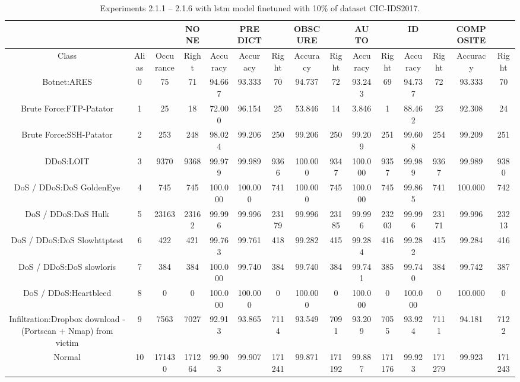 \begin{table}[htb]
    \centering
    \caption{Experiments 2.1.1 – 2.1.6 with \gls{lstm} model finetuned with 10\% of dataset CIC-IDS2017.}
    \label{table:results:lstm:flows_10}
    \begin{tabular}{@{}ccccccccccccccc@{}}
        \toprule
         &  &  & NONE &  & PREDICT &  & OBSCURE &  & AUTO &  & ID &  & COMPOSITE &  \\
        \midrule
        Class &  Alias &  Occurance &  Right &  Accuracy &  Accuracy &  Right &  Accuracy &  Right &  Accuracy &  Right &  Accuracy &  Right &  Accuracy &  Right \\
        Botnet:ARES &  0 &  75 &  71 &  94.667 &  93.333 &  70 &  94.737 &  72 &  93.243 &  69 &  94.737 &  72 &  93.333 &  70 \\
        Brute Force:FTP-Patator &  1 &  25 &  18 &  72.000 &  96.154 &  25 &  53.846 &  14 &  3.846 &  1 &  88.462 &  23 &  92.308 &  24 \\
        Brute Force:SSH-Patator &  2 &  253 &  248 &  98.024 &  99.206 &  250 &  99.206 &  250 &  99.209 &  251 &  99.608 &  254 &  99.209 &  251 \\
        DDoS:LOIT &  3 &  9370 &  9368 &  99.979 &  99.989 &  9366 &  100.000 &  9347 &  100.000 &  9357 &  99.989 &  9367 &  99.989 &  9380 \\
        DoS / DDoS:DoS GoldenEye &  4 &  745 &  745 &  100.000 &  100.000 &  741 &  100.000 &  745 &  100.000 &  745 &  99.865 &  741 &  100.000 &  742 \\
        DoS / DDoS:DoS Hulk &  5 &  23163 &  23162 &  99.996 &  99.996 &  23179 &  99.996 &  23185 &  99.996 &  23203 &  99.996 &  23171 &  99.996 &  23213 \\
        DoS / DDoS:DoS Slowhttptest &  6 &  422 &  421 &  99.763 &  99.761 &  418 &  99.282 &  415 &  99.284 &  416 &  99.282 &  415 &  99.284 &  416 \\
        DoS / DDoS:DoS slowloris &  7 &  384 &  384 &  100.000 &  99.740 &  384 &  99.740 &  384 &  99.741 &  385 &  99.740 &  384 &  99.742 &  387 \\
        DoS / DDoS:Heartbleed &  8 &  0 &  0 &  100.000 &  100.000 &  0 &  100.000 &  0 &  100.000 &  0 &  100.000 &  0 &  100.000 &  0 \\
        Infiltration:Dropbox download - (Portscan + Nmap) from victim &  9 &  7563 &  7027 &  92.913 &  93.865 &  7114 &  93.549 &  7091 &  93.209 &  7055 &  93.924 &  7111 &  94.181 &  7122 \\
        Normal &  10 &  171430 &  171264 &  99.903 &  99.907 &  171241 &  99.871 &  171192 &  99.887 &  171176 &  99.923 &  171279 &  99.923 &  171243 \\

\end{tabular}
\end{table}
